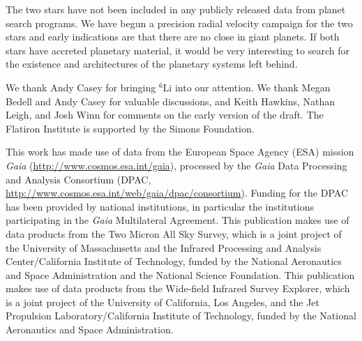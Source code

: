 \documentclass[modern, letterpaper]{aastex61}
\newcommand*\elem[1]{\ensuremath{\mathrm{#1}}}
\begin{document}

The two stars have not been included in any publicly released data from planet
search programs.
We have begun a precision radial velocity campaign for the two stars and early
indications are that there are no close in giant planets.
If both stars have accreted planetary material, it would be very interesting to
search for the existence and architectures of the planetary systems left
behind.


\acknowledgements
We thank Andy Casey for bringing $^{6}\elem{Li}$ into our attention.
We thank Megan Bedell and Andy Casey for valuable discussions,
and Keith Hawkins, Nathan Leigh, and Josh Winn for comments
on the early version of the draft.
The Flatiron Institute is supported by the Simons Foundation.

This work has made use of data from the European Space Agency (ESA) mission
{\it Gaia} (\url{http://www.cosmos.esa.int/gaia}), processed by the {\it Gaia}
Data Processing and Analysis Consortium (DPAC,
\url{http://www.cosmos.esa.int/web/gaia/dpac/consortium}). Funding for the DPAC
has been provided by national institutions, in particular the institutions
participating in the {\it Gaia} Multilateral Agreement.
This publication makes use of data products from the Two Micron All Sky Survey,
which is a joint project of the University of Massachusetts and the Infrared
Processing and Analysis Center/California Institute of Technology, funded by
the National Aeronautics and Space Administration and the National Science
Foundation.
This publication makes use of data products from the Wide-field Infrared Survey
Explorer, which is a joint project of the University of California, Los
Angeles, and the Jet Propulsion Laboratory/California Institute of Technology,
funded by the National Aeronautics and Space Administration.
\end{document}
